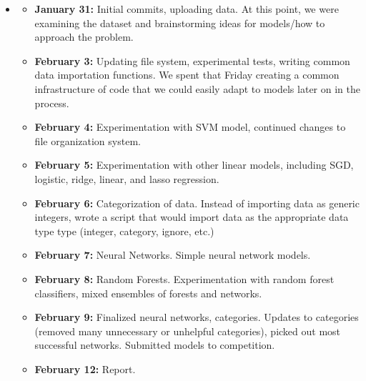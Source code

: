 \begin{itemize}
    \item {}
    \begin{itemize}
    \item \textbf{January 31:} Initial commits, uploading data. At this point, we were examining the dataset and brainstorming ideas for models/how to approach the problem.
    \item \textbf{February 3:} Updating file system, experimental tests, writing common data importation functions. We spent that Friday creating a common infrastructure of code that we could easily adapt to models later on in the process.
    \item \textbf{February 4:} Experimentation with SVM model, continued changes to file organization system.
    \item \textbf{February 5:} Experimentation with other linear models, including SGD, logistic, ridge, linear, and lasso regression.
    \item \textbf{February 6:} Categorization of data. Instead of importing data as generic integers, wrote a script that would import data as the appropriate data type type (integer, category, ignore, etc.)
    \item \textbf{February 7:} Neural Networks. Simple neural network models.
    \item \textbf{February 8:} Random Forests. Experimentation with random forest classifiers, mixed ensembles of forests and networks.
    \item \textbf{February 9:} Finalized neural networks, categories. Updates to categories (removed many unnecessary or unhelpful categories), picked out most successful networks. Submitted models to competition.
    \item \textbf{February 12:} Report.

    \end{itemize}

\end{itemize}



